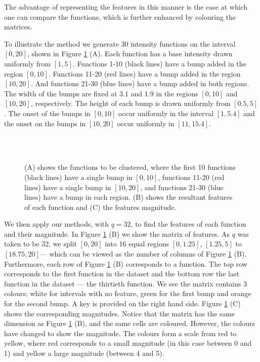 \documentclass[12pt]{book} %
\begin{document}
The advantage of representing the features in this manner is the ease at which one can compare the functions, which is further enhanced by colouring the matrices. 

To illustrate the method we generate 30 intensity functions on the interval $[0,20]$, shown in Figure \ref{fig:Example} (A). Each function has a base intensity drawn uniformly from $[1,5]$. Functions 1-10 (black lines) have a bump added in the region $[0,10]$. Functions 11-20 (red lines) have a bump added in the region $[10,20]$. And functions 21-30 (blue lines) have a bump added in both regions. The width of the bumps are fixed at 3.1 and 1.9 in the regions $[0,10]$ and $[10,20]$, respectively. The height of each bump is drawn uniformly from $[0.5,5]$. The onset of the bumps in $[0,10]$ occur uniformly in the interval $[1,5.4]$ and the onset on the bumps in $[10,20]$ occur uniformly in $[11,15.4]$. 

 \begin{figure}[t!]
   \hrulefill
   \begin{center} 
     \\
       \\
    \end{center}     
    \caption{(A) shows the functions to be clustered, where the first 10 functions (black lines) have a single bump in $[0,10]$, functions 11-20 (red lines) have a single bump in $[10,20]$, and functions 21-30 (blue lines) have a bump in each region. (B) shows the resultant features of each function and (C) the features magnitude.}
    \label{fig:Example}
    \hrulefill
    \end{figure}
    
We then apply our methods, with $q=32$, to find the features of each function and their magnitude. In Figure \ref{fig:Example} (B) we show the matrix of features. As $q$ was taken to be 32, we split $[0,20]$ into 16 equal regions $[0,1.25]$, $[1.25,5]$ to $[18.75,20]$--- which can be viewed as the number of columns of Figure \ref{fig:Example} (B). Furthermore, each row of Figure \ref{fig:Example} (B) corresponds to a function. The top row corresponds to the first function in the dataset and the bottom row the last function in the dataset --- the thirtieth function. We see the matrix contains 3 colours; white for intervals with no feature, green for the first bump and orange for the second bump. A key is provided on the right hand side. Figure \ref{fig:Example} (C) shows the corresponding magnitudes. Notice that the matrix has the same dimension as Figure \ref{fig:Example} (B), and the same cells are coloured. However, the colours have changed to show the magnitude. The colours form a scale from red to yellow, where red corresponds to a small magnitude (in this case between 0 and 1) and yellow a large magnitude (between 4 and 5). 
	
\end{document}
